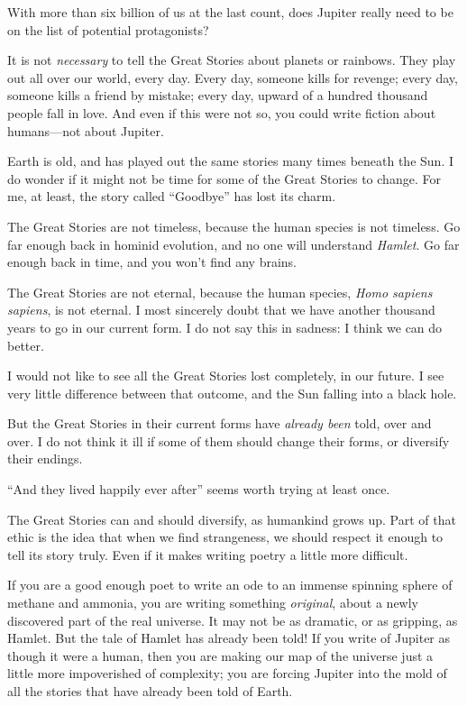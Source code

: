 {
 With more than six billion of us at the last count, does Jupiter
really need to be on the list of potential protagonists?}

{
 It is not \textit{necessary} to tell the Great Stories about
planets or rainbows. They play out all over our world, every day. Every
day, someone kills for revenge; every day, someone kills a friend by
mistake; every day, upward of a hundred thousand people fall in love.
And even if this were not so, you could write fiction about
humans---not about Jupiter.}

{
 Earth is old, and has played out the same stories many times
beneath the Sun. I do wonder if it might not be time for some of the
Great Stories to change. For me, at least, the story called
``Goodbye'' has lost its charm.}

{
 The Great Stories are not timeless, because the human species is
not timeless. Go far enough back in hominid evolution, and no one will
understand \textit{Hamlet}. Go far enough back in time, and you
won't find any brains.}

{
 The Great Stories are not eternal, because the human species,
\textit{Homo sapiens sapiens}, is not eternal. I most sincerely doubt
that we have another thousand years to go in our current form. I do not
say this in sadness: I think we can do better.}

{
 I would not like to see all the Great Stories lost completely, in
our future. I see very little difference between that outcome, and the
Sun falling into a black hole.}

{
 But the Great Stories in their current forms have \textit{already
been} told, over and over. I do not think it ill if some of them should
change their forms, or diversify their endings.}

{
 ``And they lived happily ever
after'' seems worth trying at least once.}

{
 The Great Stories can and should diversify, as humankind grows up.
Part of that ethic is the idea that when we find strangeness, we should
respect it enough to tell its story truly. Even if it makes writing
poetry a little more difficult.}

{
 If you are a good enough poet to write an ode to an immense
spinning sphere of methane and ammonia, you are writing something
\textit{original}, about a newly discovered part of the real universe.
It may not be as dramatic, or as gripping, as Hamlet. But the tale of
Hamlet has already been told! If you write of Jupiter as though it were
a human, then you are making our map of the universe just a little more
impoverished of complexity; you are forcing Jupiter into the mold of
all the stories that have already been told of Earth.}

